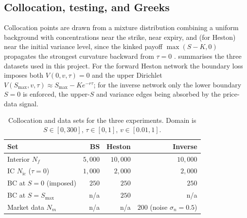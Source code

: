 \subsection{Collocation, testing, and Greeks}\label{subsec:collocation}

Collocation points are drawn from a mixture distribution combining a uniform background with concentrations near the strike, near expiry, and (for Heston) near the initial variance level, since the kinked payoff $\max(S-K,0)$ propagates the strongest curvature backward from $\tau=0$ \parencite{lu2021deepxde,wang2022expert}.  summarises the three datasets used in this project. For the forward Heston network the boundary loss imposes both $V(0,v,\tau)=0$ and the upper Dirichlet $V(S_{\max},v,\tau)\approx S_{\max}-Ke^{-r\tau}$; for the inverse network only the lower boundary $S=0$ is enforced, the upper-$S$ and variance edges being absorbed by the price-data signal.

\begin{table}[!htbp]
    \centering
    \footnotesize
    \setlength{\tabcolsep}{4pt}
    \renewcommand{\arraystretch}{1.05}
    \caption{Collocation and data sets for the three experiments. Domain is $S\in[0,300]$, $\tau\in[0,1]$, $v\in[0.01,1]$.}
    \label{tab:collocation}
    \begin{tabularx}{\linewidth}{@{} X r r r @{}}
        \toprule
        \textbf{Set} & \textbf{BS} & \textbf{Heston} & \textbf{Inverse} \\
        \midrule
        Interior $N_f$           & $5{,}000$  & $10{,}000$ & $10{,}000$ \\
        IC $N_{\mathrm{ic}}$ ($\tau=0$) & $1{,}000$ & $2{,}000$  & $2{,}000$  \\
        BC at $S=0$ (imposed)    & $250$ & $250$ & $250$ \\
        BC at $S=S_{\max}$       & n/a & $250$ & n/a \\
        Market data $N_m$        & n/a & n/a & $200$ (noise $\sigma_n{=}0.5$) \\
        \bottomrule
    \end{tabularx}
\end{table}

